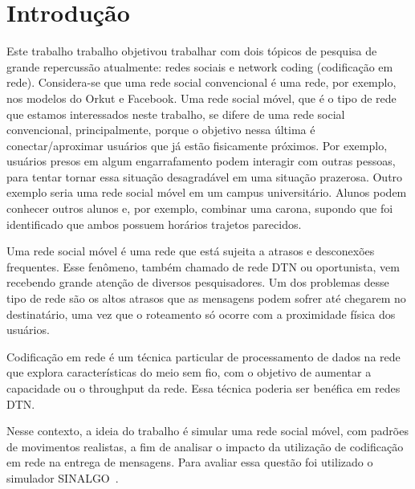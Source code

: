 \section{Introdução}

Este trabalho trabalho objetivou trabalhar com dois tópicos de pesquisa
de grande repercussão atualmente: redes sociais e network coding
(codificação em rede). Considera-se que uma rede social convencional é
uma rede, por exemplo, nos modelos do Orkut e Facebook.  Uma rede social
móvel, que é o tipo de rede que estamos interessados neste trabalho, se
difere de uma rede social convencional, principalmente, porque o
objetivo nessa última é conectar/aproximar usuários que já estão
fisicamente próximos. Por exemplo, usuários presos em algum
engarrafamento podem interagir com outras pessoas, para tentar tornar
essa situação desagradável em uma situação prazerosa. Outro exemplo
seria uma rede social móvel em um campus universitário. Alunos podem
conhecer outros alunos e, por exemplo, combinar uma carona, supondo que
foi identificado que ambos possuem horários trajetos parecidos.

Uma rede social móvel é uma rede que está sujeita a atrasos e
desconexões frequentes. Esse fenômeno, também chamado de rede DTN ou
oportunista, vem recebendo grande atenção de diversos pesquisadores. Um
dos problemas desse tipo de rede são os altos atrasos que as mensagens
podem sofrer até chegarem no destinatário, uma vez que o roteamento só
ocorre com a proximidade física dos usuários.

Codificação em rede é um técnica particular de processamento de dados na
rede que explora características do meio sem fio, com o objetivo de
aumentar a capacidade ou o throughput da rede. Essa técnica poderia ser
benéfica em redes DTN.

Nesse contexto, a ideia do trabalho é simular uma rede social móvel, com
padrões de movimentos realistas, a fim de analisar o impacto da
utilização de codificação em rede na entrega de mensagens. Para avaliar
essa questão foi utilizado o simulador SINALGO~\cite{sinalgo}. 
